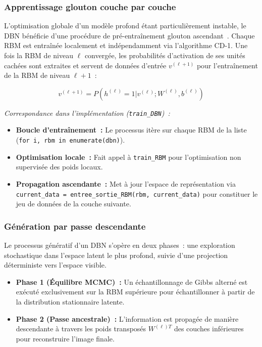 \documentclass[11pt,a4paper]{article}
\renewcommand{\texttt}[1]{\urlstyle{tt}\nolinkurl{#1}}
\begin{document}
\subsubsection{Apprentissage glouton couche par couche}

L'optimisation globale d'un mod\`ele profond \'etant particuli\`erement instable, le DBN b\'en\'eficie d'une proc\'edure de pr\'e-entra\^inement glouton ascendant~\cite{bengio2007}. Chaque RBM est entra\^in\'ee localement et ind\'ependamment via l'algorithme CD-1. Une fois la RBM de niveau $\ell$ converg\'ee, les probabilit\'es d'activation de ses unit\'es cach\'ees sont extraites et servent de donn\'ees d'entr\'ee $v^{(\ell+1)}$ pour l'entra\^inement de la RBM de niveau $\ell + 1$~:

\begin{equation}
v^{(\ell+1)} = P(h^{(\ell)} = 1 | v^{(\ell)}; W^{(\ell)}, b^{(\ell)})
\label{eq:greedy}
\end{equation}

\noindent\textit{Correspondance dans l'impl\'ementation (\texttt{train\_DBN})~:}
\begin{itemize}
    \item \textbf{Boucle d'entra\^inement~:} Le processus it\`ere sur chaque RBM de la liste (\texttt{for i, rbm in enumerate(dbn)}).
    \item \textbf{Optimisation locale~:} Fait appel \`a \texttt{train\_RBM} pour l'optimisation non supervis\'ee des poids locaux.
    \item \textbf{Propagation ascendante~:} Met \`a jour l'espace de repr\'esentation via \texttt{current\_data = entree\_sortie\_RBM(rbm, current\_data)} pour constituer le jeu de donn\'ees de la couche suivante.
\end{itemize}

\subsubsection{G\'en\'eration par passe descendante}

Le processus g\'en\'eratif d'un DBN s'op\`ere en deux phases~: une exploration stochastique dans l'espace latent le plus profond, suivie d'une projection d\'eterministe vers l'espace visible.

\begin{itemize}
    \item \textbf{Phase 1 (\'Equilibre MCMC)~:} Un \'echantillonnage de Gibbs altern\'e est ex\'ecut\'e exclusivement sur la RBM sup\'erieure pour \'echantillonner \`a partir de la distribution stationnaire latente.
    \item \textbf{Phase 2 (Passe ancestrale)~:} L'information est propag\'ee de mani\`ere descendante \`a travers les poids transpos\'es $W^{(\ell)T}$ des couches inf\'erieures pour reconstruire l'image finale.
\end{itemize}
\end{document}
